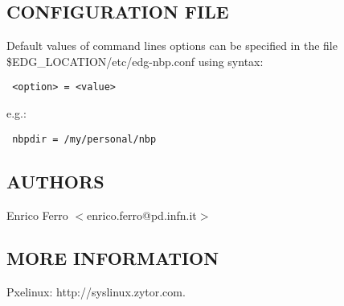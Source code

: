 \subsection*{CONFIGURATION FILE\label{edg-nbp_CONFIGURATION_FILE}}


Default values of command lines options can be specified in the file
\$EDG\_LOCATION/etc/edg-nbp.conf using syntax:

\begin{verbatim}
 <option> = <value>
\end{verbatim}


e.g.:

\begin{verbatim}
 nbpdir = /my/personal/nbp
\end{verbatim}
\subsection*{AUTHORS\label{edg-nbp_AUTHORS}}


Enrico Ferro $<$enrico.ferro@pd.infn.it$>$

\subsection*{MORE INFORMATION\label{edg-nbp_MORE_INFORMATION}}


Pxelinux: http://syslinux.zytor.com.


